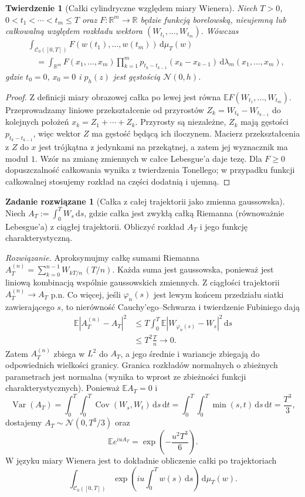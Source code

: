 \documentclass[11pt,a4paper,oneside]{report}
\numberwithin{equation}{chapter}
\theoremstyle{plain}
\newtheorem{twierdzenie}{Twierdzenie}[chapter]
\theoremstyle{definition}
\newtheorem{zadanie}{Zadanie rozwiązane}[chapter]
\theoremstyle{remark}
\newcommand{\R}{\mathbb{R}}
\newcommand{\E}{\mathbb{E}}
\newcommand{\Var}{\operatorname{Var}}
\newcommand{\Cov}{\operatorname{Cov}}
\newcommand{\calC}{\mathcal{C}}
\newcommand{\dd}{\mathrm{d}}
\newcommand{\Normal}{\mathcal{N}}
\begin{document}
\begin{twierdzenie}[Całki cylindryczne względem miary Wienera]
Niech $T>0$, $0<t_1<\cdots<t_m\le T$ oraz
$F:\R^m\to\R$ będzie funkcją borelowską, nieujemną
lub całkowalną względem rozkładu wektora
$(W_{t_1},\ldots,W_{t_m})$. Wówczas
\begin{align*}
&\int_{\calC_0([0,T])}F(w(t_1),\ldots,w(t_m))\,\dd\mu_T(w)\\
&\quad=\int_{\R^m}F(x_1,\ldots,x_m)
\prod_{k=1}^m p_{t_k-t_{k-1}}(x_k-x_{k-1})
\,\dd\lambda_m(x_1,\ldots,x_m),
\end{align*}
gdzie $t_0=0$, $x_0=0$ i $p_h(z)$ jest gęstością
$\Normal(0,h)$.
\end{twierdzenie}
\begin{proof}
Z definicji miary obrazowej całka po lewej jest równa
$\E F(W_{t_1},\ldots,W_{t_m})$.
Przeprowadzamy liniowe przekształcenie od przyrostów
$Z_k=W_{t_k}-W_{t_{k-1}}$ do kolejnych położeń
$x_k=Z_1+\cdots+Z_k$.
Przyrosty są niezależne, $Z_k$ mają gęstości
$p_{t_k-t_{k-1}}$, więc wektor $Z$ ma gęstość
będącą ich iloczynem. Macierz przekształcenia z $Z$
do $x$ jest trójkątna z jedynkami na przekątnej,
a zatem jej wyznacznik ma moduł $1$.
Wzór na zmianę zmiennych w całce Lebesgue'a
daje tezę. Dla $F\ge0$ dopuszczalność całkowania
wynika z twierdzenia Tonellego; w przypadku funkcji
całkowalnej stosujemy rozkład na części dodatnią i ujemną.
\end{proof}

\begin{zadanie}[Całka z całej trajektorii jako zmienna gaussowska]
Niech $A_T:=\int_0^T W_s\,\dd s$, gdzie całka jest zwykłą
całką Riemanna (równoważnie Lebesgue'a) z ciągłej trajektorii.
Obliczyć rozkład $A_T$ i jego funkcję charakterystyczną.

\emph{Rozwiązanie.} Aproksymujmy całkę sumami Riemanna
$A_T^{(n)}=\sum_{k=0}^{n-1}W_{kT/n}\,(T/n)$.
Każda suma jest gaussowska, ponieważ jest liniową
kombinacją wspólnie gaussowskich zmiennych.
Z ciągłości trajektorii $A_T^{(n)}\to A_T$ p.n.
Co więcej, jeśli $\varphi_n(s)$ jest lewym końcem
przedziału siatki zawierającego $s$, to nierówność
Cauchy'ego--Schwarza i twierdzenie Fubiniego dają
\begin{align*}
\E|A_T^{(n)}-A_T|^2
&\le T\int_0^T\E|W_{\varphi_n(s)}-W_s|^2\,\dd s\\
&\le T^2\frac{T}{n}\longrightarrow0.
\end{align*}
Zatem $A_T^{(n)}$ zbiega w $L^2$ do $A_T$,
a jego średnie i wariancje zbiegają do odpowiednich
wielkości granicy. Granica rozkładów normalnych o
zbieżnych parametrach jest normalna (wynika to wprost
ze zbieżności funkcji charakterystycznych).
Ponieważ $\E A_T=0$ i
\[
\Var(A_T)=\int_0^T\!\int_0^T\Cov(W_s,W_t)
\,\dd s\,\dd t
=\int_0^T\!\int_0^T\min(s,t)\,\dd s\,\dd t
=\frac{T^3}{3},
\]
dostajemy $A_T\sim\Normal(0,T^3/3)$ oraz
\[
\E e^{iuA_T}=\exp\left(-\frac{u^2T^3}{6}\right).
\]
W języku miary Wienera jest to dokładnie obliczenie
całki po trajektoriach
\[
\int_{\calC_0([0,T])}
\exp\left(iu\int_0^T w(s)\,\dd s\right)\,\dd\mu_T(w).
\]
\end{zadanie}
\end{document}
